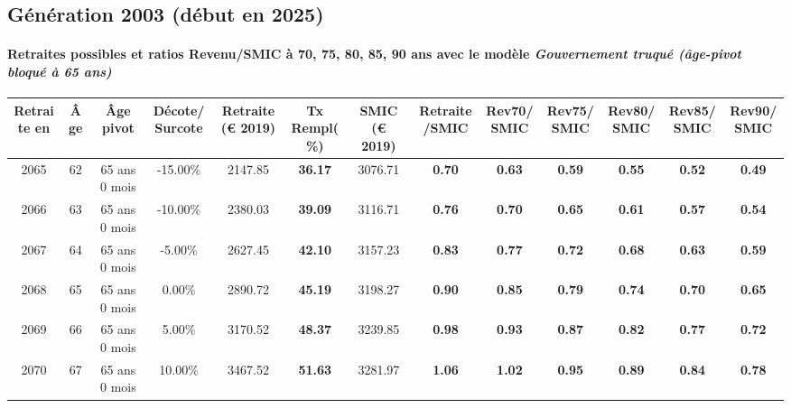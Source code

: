 \newpage 
 
\subsection{Génération 2003 (début en 2025)} 

\paragraph{Retraites possibles et ratios Revenu/SMIC à 70, 75, 80, 85, 90 ans avec le modèle \emph{Gouvernement truqué (âge-pivot bloqué à 65 ans)}}  
 
{ \scriptsize \begin{center} 
\begin{tabular}[htb]{|c|c||c|c||c|c||c||c|c|c|c|c|c|} 
\hline 
 Retraite en &  Âge &  Âge pivot &  Décote/Surcote &  Retraite (\euro{} 2019) &  Tx Rempl(\%) &  SMIC (\euro{} 2019) &  Retraite/SMIC &  Rev70/SMIC &  Rev75/SMIC &  Rev80/SMIC &  Rev85/SMIC &  Rev90/SMIC \\ 
\hline \hline 
 2065 &  62 &  65 ans 0 mois &  -15.00\% &  2147.85 &  {\bf 36.17} &  3076.71 &  {\bf {\color{red} 0.70}} &  {\bf {\color{red} 0.63}} &  {\bf {\color{red} 0.59}} &  {\bf {\color{red} 0.55}} &  {\bf {\color{red} 0.52}} &  {\bf {\color{red} 0.49}} \\ 
\hline 
 2066 &  63 &  65 ans 0 mois &  -10.00\% &  2380.03 &  {\bf 39.09} &  3116.71 &  {\bf {\color{red} 0.76}} &  {\bf {\color{red} 0.70}} &  {\bf {\color{red} 0.65}} &  {\bf {\color{red} 0.61}} &  {\bf {\color{red} 0.57}} &  {\bf {\color{red} 0.54}} \\ 
\hline 
 2067 &  64 &  65 ans 0 mois &  -5.00\% &  2627.45 &  {\bf 42.10} &  3157.23 &  {\bf {\color{red} 0.83}} &  {\bf {\color{red} 0.77}} &  {\bf {\color{red} 0.72}} &  {\bf {\color{red} 0.68}} &  {\bf {\color{red} 0.63}} &  {\bf {\color{red} 0.59}} \\ 
\hline 
 2068 &  65 &  65 ans 0 mois &  0.00\% &  2890.72 &  {\bf 45.19} &  3198.27 &  {\bf {\color{red} 0.90}} &  {\bf {\color{red} 0.85}} &  {\bf {\color{red} 0.79}} &  {\bf {\color{red} 0.74}} &  {\bf {\color{red} 0.70}} &  {\bf {\color{red} 0.65}} \\ 
\hline 
 2069 &  66 &  65 ans 0 mois &  5.00\% &  3170.52 &  {\bf 48.37} &  3239.85 &  {\bf {\color{red} 0.98}} &  {\bf {\color{red} 0.93}} &  {\bf {\color{red} 0.87}} &  {\bf {\color{red} 0.82}} &  {\bf {\color{red} 0.77}} &  {\bf {\color{red} 0.72}} \\ 
\hline 
 2070 &  67 &  65 ans 0 mois &  10.00\% &  3467.52 &  {\bf 51.63} &  3281.97 &  {\bf 1.06} &  {\bf 1.02} &  {\bf {\color{red} 0.95}} &  {\bf {\color{red} 0.89}} &  {\bf {\color{red} 0.84}} &  {\bf {\color{red} 0.78}} \\ 
\hline 
\hline 
\end{tabular} 
\end{center} } 

